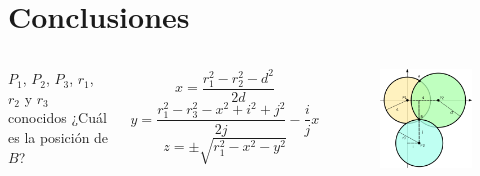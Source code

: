 \documentclass[mathserif]{beamer}
\begin{document}
\section{Conclusiones}
\begin{frame}
\begin{columns}[t] %


$P_1$, $P_2$, $P_3$, $r_1$, $r_2$ y $r_3$ conocidos
¿Cuál es la posición de $B$?

\vspace*{.1\textwidth}

\begin{equation*}
x=\frac{r_1^2-r_2^2-d^2}{2d}
\end{equation*}
\begin{equation*}
y=\frac{r_1^2-r_3^2-x^2+i^2+j^2}{2j}-\frac{i}{j}x
\end{equation*}
\begin{equation*}
z=\pm\sqrt{r_1^2-x^2-y^2}
\end{equation*}

\begin{figure}
\includegraphics[width=\textwidth]{../figures_chesta/estado_del_arte/trilateration}
\end{figure}

\end{columns}

\end{frame}
\end{document}
